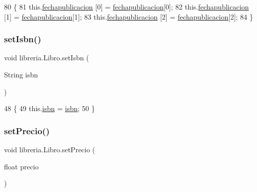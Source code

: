 \begin{DoxyCode}
80                                                                 \{
81         this.\mbox{\hyperlink{classlibreria_1_1_libro_a1feec01556c7a8ffe5963b544b7ebc58}{fechapublicacion}} [0] = \mbox{\hyperlink{classlibreria_1_1_libro_a1feec01556c7a8ffe5963b544b7ebc58}{fechapublicacion}}[0];
82         this.\mbox{\hyperlink{classlibreria_1_1_libro_a1feec01556c7a8ffe5963b544b7ebc58}{fechapublicacion}} [1] = \mbox{\hyperlink{classlibreria_1_1_libro_a1feec01556c7a8ffe5963b544b7ebc58}{fechapublicacion}}[1];
83         this.\mbox{\hyperlink{classlibreria_1_1_libro_a1feec01556c7a8ffe5963b544b7ebc58}{fechapublicacion}} [2] = \mbox{\hyperlink{classlibreria_1_1_libro_a1feec01556c7a8ffe5963b544b7ebc58}{fechapublicacion}}[2];
84     \}
\end{DoxyCode}
\mbox{\label{classlibreria_1_1_libro_ac9b15637f6aa44daa264bc9f7f9627cb}} 
\subsubsection{\texorpdfstring{set\+Isbn()}{setIsbn()}}
{\footnotesize\ttfamily void libreria.\+Libro.\+set\+Isbn (\begin{DoxyParamCaption}\item[{String}]{isbn }\end{DoxyParamCaption})\hspace{0.3cm}{\ttfamily [inline]}}


\begin{DoxyCode}
48                                      \{
49         this.\mbox{\hyperlink{classlibreria_1_1_libro_a855939c41be35682aad6b6c08962dde3}{isbn}} = \mbox{\hyperlink{classlibreria_1_1_libro_a855939c41be35682aad6b6c08962dde3}{isbn}};
50     \}
\end{DoxyCode}
\mbox{\label{classlibreria_1_1_libro_a0263e8520885851783e3f46d150be0c5}} 
\subsubsection{\texorpdfstring{set\+Precio()}{setPrecio()}}
{\footnotesize\ttfamily void libreria.\+Libro.\+set\+Precio (\begin{DoxyParamCaption}\item[{float}]{precio }\end{DoxyParamCaption})\hspace{0.3cm}{\ttfamily [inline]}}


